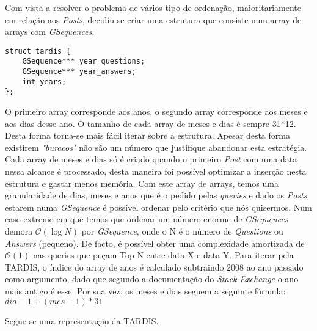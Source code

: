 \documentclass[letterpaper, 10 pt, conference]{IEEEtran}  %
\begin{document}
Com vista a resolver o problema de vários tipo de ordenação, maioritariamente em relação aos \textit{Posts}, decidiu-se criar uma estrutura que consiste num array de arrays com \textit{GSequences}.
\begin{lstlisting}
struct tardis {
    GSequence*** year_questions;
    GSequence*** year_answers;
    int years;
};

\end{lstlisting}
O primeiro array corresponde aos anos, o segundo array corresponde aos meses e aos dias desse ano. O tamanho de cada array de meses e dias é sempre 31*12. Desta forma torna-se mais fácil iterar sobre a estrutura. Apesar desta forma existirem \textit{"buracos"} não são um número que justifique abandonar esta estratégia.
Cada array de meses e dias só é criado quando o primeiro \textit{Post} com uma data nessa alcance é processado, desta maneira foi possível optimizar a inserção nesta estrutura e gastar menos memória.
Com este array de arrays, temos uma granularidade de dias, meses e anos que é o pedido pelas \textit{queries} e dado os \textit{Posts} estarem numa \textit{GSequence} é possível ordenar pelo critério que nós quisermos.
Num caso extremo em que temos que ordenar um número enorme de \textit{GSequences} demora $\mathcal{O}(\log{}N)$ por \textit{GSequence}, onde o N é o número de \textit{Questions} ou \textit{Answers} (pequeno). De facto, é possível obter uma complexidade amortizada de $\mathcal{O}(1)$ nas queries que peçam Top N entre data X e data Y.
Para iterar pela TARDIS, o índice do array de anos é calculado subtraindo 2008 ao ano passado como argumento, dado que segundo a documentação do \textit{Stack Exchange} o ano mais antigo é esse. Por sua vez, os meses e dias seguem a seguinte fórmula:
$dia-1 + (mes-1)*31$

Segue-se uma representação da TARDIS.
\end{document}

